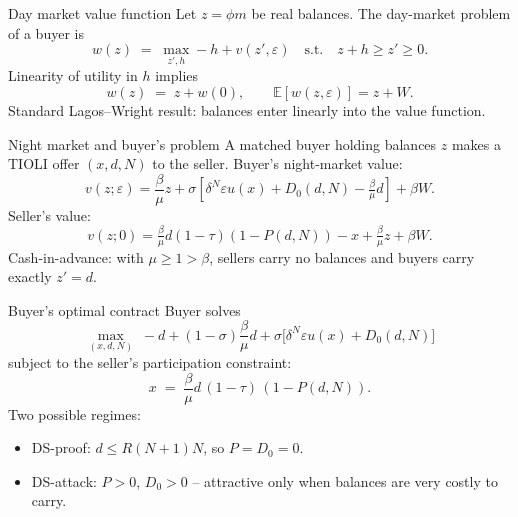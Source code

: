 \documentclass[aspectratio=169,xcolor=dvipsnames]{beamer}
\begin{document}
\begin{frame}{Day market value function}
    Let $z=\phi m$ be real balances. The day-market problem of a buyer is
    \[
        w(z) \;=\; \max_{z',h} -h + v(z',\varepsilon)\quad
        \text{s.t.}\quad z+h \ge z' \ge 0. \tag{24,25}
    \]
    Linearity of utility in $h$ implies
    \[
        w(z) \;=\; z + w(0),\qquad
        \mathbb{E}[w(z,\varepsilon)] = z + W. \tag{27,28}
    \]
    Standard Lagos--Wright result: balances enter linearly into the value function.
\end{frame}

\begin{frame}{Night market and buyer's problem}
    A matched buyer holding balances $z$ makes a TIOLI offer $(x,d,N)$ to the seller.
    Buyer's night-market value:
    \[
        v(z;\varepsilon) = \frac{\beta}{\mu}z + \sigma[\delta^N\varepsilon u(x) + D_0(d,N) - \tfrac{\beta}{\mu}d] + \beta W. \tag{29}
    \]
    Seller's value:
    \[
        v(z;0) = \tfrac{\beta}{\mu}d(1-\tau)(1-P(d,N)) - x + \tfrac{\beta}{\mu}z + \beta W. \tag{30}
    \]
    \vspace{1mm}
    Cash-in-advance: with $\mu\ge 1 > \beta$, sellers carry no balances and buyers carry exactly $z'=d$.
\end{frame}

\begin{frame}{Buyer's optimal contract}
    Buyer solves
    \[
        \max_{(x,d,N)} \;-d + (1-\sigma)\frac{\beta}{\mu}d + \sigma\bigl[\delta^N\varepsilon u(x) + D_0(d,N)\bigr]
    \]
    subject to the seller's participation constraint:
    \[
        x \;=\; \frac{\beta}{\mu}d\,(1-\tau)\,(1-P(d,N)). \tag{33}
    \]
    \vspace{3mm}
    Two possible regimes:
    \begin{itemize}
        \item DS-proof: $d\le R(N+1)N$, so $P=D_0=0$.
        \item DS-attack: $P>0$, $D_0>0$ -- attractive only when balances are very costly to carry.
    \end{itemize}
\end{frame}
\end{document}
